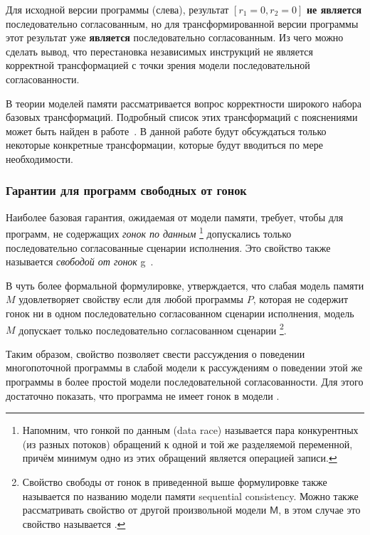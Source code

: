 \bigskip

Для исходной версии программы (слева), 
результат $[r_1=0, r_2=0]$ \textbf{не является} 
последовательно согласованным, но для трансформированной 
версии программы этот результат уже \textbf{является} 
последовательно согласованным. 
Из чего можно сделать вывод, что перестановка независимых инструкций 
не является корректной трансформацией с точки зрения 
модели последовательной согласованности. 

В теории моделей памяти рассматривается вопрос корректности 
широкого набора базовых трансформаций.
Подробный список этих трансформаций с пояснениями 
может быть найден в работе~\cite{Moiseenko-al:PCS21}.
В данной работе будут обсуждаться только некоторые 
конкретные трансформации, которые будут вводиться по мере необходимости. 


\subsubsection*{Гарантии для программ свободных от гонок}

Наиболее базовая гарантия, ожидаемая от модели памяти, 
требует, чтобы для программ, не содержащих \emph{гонок по данным}%
\footnote{Напомним, что гонкой по данным (data race) называется пара конкурентных (из разных потоков)
обращений к одной и той же разделяемой переменной,
причём минимум одно из этих обращений является операцией записи.} 
допускались только последовательно согласованные сценарии исполнения. 
Это свойство также называется \emph{свободой от гонок}
g~\cite{Manson-al:POPL05}.

В чуть более формальной формулировке, утверждается, 
что слабая модель памяти $M$ удовлетворяет свойству \DRF
если для любой программы $P$, которая не содержит 
гонок ни в одном последовательно согласованном сценарии исполнения,
модель $M$ допускает только последовательно согласованном сценарии%
\footnote{Свойство свободы от гонок в приведенной выше формулировке
также называется  по названию модели памяти 
sequential consistency. 
Можно также рассматривать свойство \DRF от другой 
произвольной модели $\mathsf{M}$, в этом случае это 
свойство называется .}.

Таким образом, свойство \DRF позволяет свести рассуждения о поведении 
многопоточной программы в слабой модели к рассуждениям о поведении 
этой же программы в более простой модели последовательной согласованности.
Для этого достаточно показать, что программа не имеет гонок в модели \SC. 

